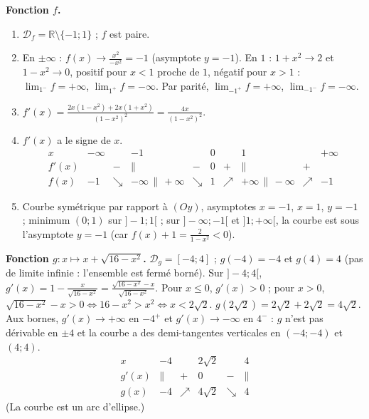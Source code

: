 \begin{corrige}
\begin{sol}
\textbf{Fonction $f$.}
\begin{enumerate}
\item $\mathcal{D}_f = \mathbb{R} \setminus \{-1 ; 1\}$ ; $f$ est paire.
\item En $\pm\infty$ : $f(x) \to \frac{x^2}{-x^2} = -1$ (asymptote $y = -1$).
      En $1$ : $1 + x^2 \to 2$ et $1 - x^2 \to 0$, positif pour $x < 1$ proche de $1$, n\'egatif pour $x > 1$ :
      $\lim_{1^-} f = +\infty$, $\lim_{1^+} f = -\infty$. Par parit\'e, $\lim_{-1^+} f = +\infty$, $\lim_{-1^-} f = -\infty$.
\item $f'(x) = \frac{2x(1 - x^2) + 2x(1 + x^2)}{(1-x^2)^2} = \frac{4x}{(1-x^2)^2}$.
\item $f'(x)$ a le signe de $x$.
      \[
      \begin{array}{c|ccccccccc}
      x & -\infty & & -1 & & 0 & & 1 & & +\infty \\ \hline
      f'(x) & & - & \| & - & 0 & + & \| & + & \\ \hline
      f(x) & -1 & \searrow & -\infty \, \| \, +\infty & \searrow & 1 & \nearrow & +\infty \, \| \, -\infty & \nearrow & -1
      \end{array}
      \]
\item Courbe sym\'etrique par rapport \`a $(Oy)$, asymptotes $x = -1$, $x = 1$, $y = -1$ ; minimum $(0;1)$ sur $]-1;1[$ ;
      sur $]-\infty;-1[$ et $]1;+\infty[$, la courbe est sous l'asymptote $y = -1$ (car $f(x) + 1 = \frac{2}{1 - x^2} < 0$).
\end{enumerate}
\textbf{Fonction $g : x \mapsto x + \sqrt{16 - x^2}$.}
$\mathcal{D}_g = [-4 ; 4]$ ; $g(-4) = -4$ et $g(4) = 4$ (pas de limite infinie : l'ensemble est ferm\'e born\'e). Sur $]-4;4[$,
$g'(x) = 1 - \frac{x}{\sqrt{16 - x^2}} = \frac{\sqrt{16-x^2} - x}{\sqrt{16-x^2}}$.
Pour $x \leq 0$, $g'(x) > 0$ ; pour $x > 0$, $\sqrt{16 - x^2} - x > 0 \iff 16 - x^2 > x^2 \iff x < 2\sqrt{2}$.
$g(2\sqrt{2}) = 2\sqrt{2} + 2\sqrt{2} = 4\sqrt{2}$. Aux bornes, $g'(x) \to +\infty$ en $-4^+$ et $g'(x) \to -\infty$ en $4^-$ :
$g$ n'est pas d\'erivable en $\pm 4$ et la courbe a des demi-tangentes verticales en $(-4;-4)$ et $(4;4)$.
\[
\begin{array}{c|ccccc}
x & -4 & & 2\sqrt{2} & & 4 \\ \hline
g'(x) & \| & + & 0 & - & \| \\ \hline
g(x) & -4 & \nearrow & 4\sqrt{2} & \searrow & 4
\end{array}
\]
(La courbe est un arc d'ellipse.)


\end{sol}
\end{corrige}
